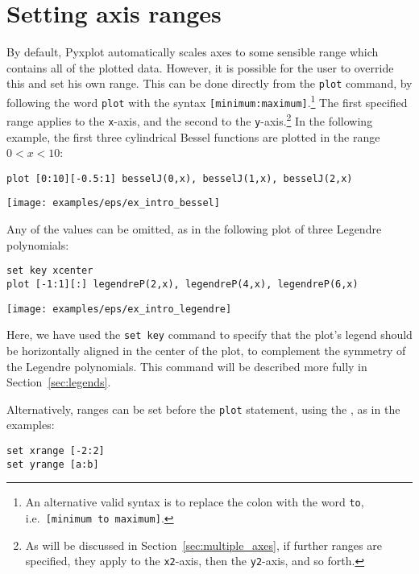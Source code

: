 \section{Setting axis ranges}
\label{sec:plot_ranges}

By default, Pyxplot automatically scales axes to some sensible range which
contains all of the plotted data. However, it is possible for the user to
override this and set his own range. This can be
done directly from the {\tt plot} command, by following the word {\tt plot}
with the syntax {\tt [minimum:maximum]}.\footnote{An alternative valid syntax
is to replace the colon with the word {\tt to}, i.e.\ {\tt [minimum to
maximum]}.} The first specified range applies to the {\tt x}-axis, and the
second to the {\tt y}-axis.\footnote{As will be discussed in
Section~\ref{sec:multiple_axes}, if further ranges are specified, they apply to
the {\tt x2}-axis, then the {\tt y2}-axis, and so forth.} In the following
example, the first three cylindrical Bessel functions are plotted in the range
$0<x<10$:

\begin{verbatim}
plot [0:10][-0.5:1] besselJ(0,x), besselJ(1,x), besselJ(2,x)
\end{verbatim}
\begin{center}
\texttt{[image: examples/eps/ex\_intro\_bessel]}
\end{center}

\noindent Any of the values can be omitted, as in the following plot of
three Legendre polynomials:

\begin{verbatim}
set key xcenter
plot [-1:1][:] legendreP(2,x), legendreP(4,x), legendreP(6,x)
\end{verbatim}
\begin{center}
\texttt{[image: examples/eps/ex\_intro\_legendre]}
\end{center}

\noindent Here, we have used the {\tt set key} command to specify that the
plot's legend should be horizontally aligned in the center of the plot, to
complement the symmetry of the Legendre polynomials. This command will be
described more fully in Section~\ref{sec:legends}.

Alternatively, ranges can be set before the {\tt plot} statement, using the
, as in the examples:

\begin{verbatim}
set xrange [-2:2]
set yrange [a:b]
\end{verbatim}

